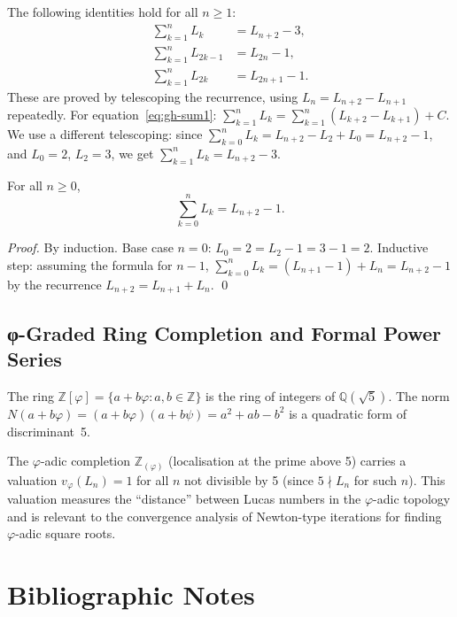 The following identities hold for all \(n \geq 1\):
\begin{align}
  \sum_{k=1}^n L_k &= L_{n+2} - 3, \label{eq:gh-sum1} \\
  \sum_{k=1}^n L_{2k-1} &= L_{2n} - 1, \label{eq:gh-sum2} \\
  \sum_{k=1}^n L_{2k} &= L_{2n+1} - 1. \label{eq:gh-sum3}
\end{align}
These are proved by telescoping the recurrence,
using \(L_n = L_{n+2} - L_{n+1}\) repeatedly.
For equation~\eqref{eq:gh-sum1}:
\(\sum_{k=1}^n L_k = \sum_{k=1}^n (L_{k+2}-L_{k+1}) + C\).
We use a different telescoping: since
\(\sum_{k=0}^{n} L_k = L_{n+2} - L_2 + L_0 = L_{n+2} - 1\),
and \(L_0 = 2\), \(L_2 = 3\), we get
\(\sum_{k=1}^n L_k = L_{n+2} - 3\).

\begin{proposition}
\label{prop:gh-sumformula}
For all \(n \geq 0\),
\[
  \sum_{k=0}^n L_k = L_{n+2} - 1.
\]
\end{proposition}
\begin{proof}
By induction.  Base case \(n=0\): \(L_0 = 2 = L_2 - 1 = 3 - 1 = 2\). \checkmark
Inductive step: assuming the formula for \(n-1\),
\(\sum_{k=0}^n L_k = (L_{n+1}-1) + L_n = L_{n+2} - 1\)
by the recurrence \(L_{n+2} = L_{n+1}+L_n\).
\qed
\end{proof}

\subsection{φ-Graded Ring Completion and Formal Power Series}
\label{subsec:gh-completion}

The ring \(\mathbb{Z}[\varphi] = \{a + b\varphi : a,b \in \mathbb{Z}\}\)
is the ring of integers of \(\mathbb{Q}(\sqrt{5})\).
The norm \(N(a+b\varphi) = (a+b\varphi)(a+b\psi) = a^2+ab-b^2\)
is a quadratic form of discriminant~5.

The \(\varphi\)-adic completion \(\mathbb{Z}_{(\varphi)}\) (localisation
at the prime above 5) carries a valuation
\(v_\varphi(L_n) = 1\) for all \(n\) not divisible by 5
(since \(5 \nmid L_n\) for such \(n\)).
This valuation measures the ``distance'' between Lucas numbers in the
\(\varphi\)-adic topology and is relevant to the convergence analysis
of Newton-type iterations for finding \(\varphi\)-adic square roots.

\section{Bibliographic Notes}
\label{sec:gh-biblio}

